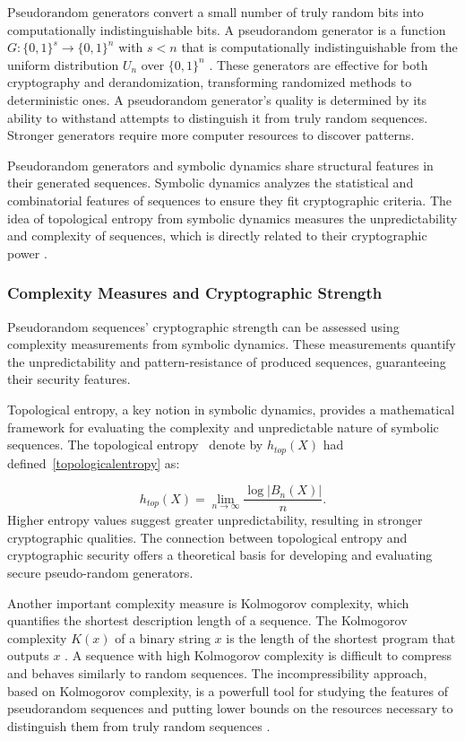 \documentclass[12pt,a4paper]{article}
\begin{document}
$\mathrm{Pseudorandom}$ generators convert a small number of truly random bits into computationally indistinguishable bits. A pseudorandom generator is a function $G: \{0,1\}^s \rightarrow \{0,1\}^n$ with $s < n$ that is computationally indistinguishable from the uniform distribution $U_n$ over $\{0,1\}^n$ \cite{Blum}.  These generators are effective for both cryptography and derandomization, transforming randomized methods to deterministic ones.  A pseudorandom generator's quality is determined by its ability to withstand attempts to distinguish it from truly random sequences. Stronger generators require more computer resources to discover patterns.

Pseudorandom generators and symbolic dynamics share structural features in their generated sequences. Symbolic dynamics analyzes the statistical and combinatorial features of sequences to ensure they fit cryptographic criteria.  The idea of topological entropy from symbolic dynamics measures the unpredictability and complexity of sequences, which is directly related to their cryptographic power \cite{Lind}.
\subsubsection{Complexity Measures and Cryptographic Strength}

Pseudorandom sequences' cryptographic strength can be assessed using complexity measurements from symbolic dynamics. These measurements quantify the unpredictability and pattern-resistance of produced sequences, guaranteeing their security features.

Topological entropy, a key notion in symbolic dynamics, provides a mathematical framework for evaluating the complexity and unpredictable nature of symbolic sequences. The topological entropy~\cite{Adler} denote by $h_{top}(X)$ had defined~\eqref{topologicalentropy} as:

\[
h_{top}(X) = \lim_{n \to \infty} \frac{\log|B_n(X)|}{n}.
\]
Higher entropy values suggest greater unpredictability, resulting in stronger cryptographic qualities. The connection between topological entropy and cryptographic security offers a theoretical basis for developing and evaluating secure pseudo-random generators.

Another important complexity measure is Kolmogorov complexity, which quantifies the shortest description length of a sequence. The Kolmogorov complexity $K(x)$ of a binary string $x$ is the length of the shortest program that outputs $x$ \cite{Kolmogorov}. A sequence with high Kolmogorov complexity is difficult to compress and behaves similarly to random sequences. The incompressibility approach, based on Kolmogorov complexity, is a powerfull tool for studying the features of pseudorandom sequences and putting lower bounds on the resources necessary to distinguish them from truly random sequences \cite{Li}.
\end{document}
